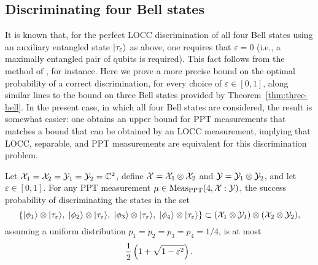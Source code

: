 \subsection{Discriminating four Bell states}

It is known that, for the perfect LOCC discrimination of all four Bell states
using an auxiliary entangled state $\lvert\mspace{0.5mu} \tau_{\varepsilon} \mspace{0.5mu} \rangle$ as above,
one requires that $\varepsilon = 0$ (i.e., a maximally entangled pair of qubits
is required).
This fact follows from the method of \cite{Horodecki03}, for instance.
Here we prove a more precise bound on the optimal probability of a correct
discrimination, for every choice of $\varepsilon\in[0,1]$, along similar lines
to the bound on three Bell states provided by Theorem~\ref{thm:three-bell}.
In the present case, in which all four Bell states are considered, the result
is somewhat easier: one obtains an upper bound for PPT measurements that
matches a bound that can be obtained by an LOCC measurement,
implying that LOCC, separable, and PPT measurements are equivalent for this
discrimination problem.

\begin{theorem}
  \label{thm:four-bell}
  Let $\mathcal{X}_1 = \mathcal{X}_2 = \mathcal{Y}_1 = \mathcal{Y}_2 = \mathbb{C}^2$, define
  $\mathcal{X} = \mathcal{X}_1 \otimes \mathcal{X}_2$ and $\mathcal{Y} = \mathcal{Y}_1 \otimes \mathcal{Y}_2$, and let
  $\varepsilon\in [0,1]$.
  For any PPT measurement $\mu\in\mathrm{Meas}_{\mathrm{PPT}}(4,\mathcal{X}:\mathcal{Y})$, the success
  probability of discriminating the states in the set
  \begin{equation}
    \label{eq:set-four-bells}
    \left\{ \lvert\mspace{0.5mu} \phi_{1} \mspace{0.5mu} \rangle \otimes \lvert\mspace{0.5mu} \tau_{\varepsilon} \mspace{0.5mu} \rangle,\; 
    \lvert\mspace{0.5mu} \phi_{2} \mspace{0.5mu} \rangle \otimes \lvert\mspace{0.5mu} \tau_{\varepsilon} \mspace{0.5mu} \rangle,\;
    \lvert\mspace{0.5mu} \phi_{3} \mspace{0.5mu} \rangle \otimes \lvert\mspace{0.5mu} \tau_{\varepsilon} \mspace{0.5mu} \rangle,\; 
    \lvert\mspace{0.5mu} \phi_{4} \mspace{0.5mu} \rangle \otimes \lvert\mspace{0.5mu} \tau_{\varepsilon} \mspace{0.5mu} \rangle\right\} 
    \subset (\mathcal{X}_1\otimes\mathcal{Y}_1)\otimes(\mathcal{X}_2\otimes\mathcal{Y}_2),
  \end{equation}
  assuming a uniform distribution $p_1 = p_2 = p_3 = p_4 = 1/4$, is at most
  \begin{equation}
    \label{eq:probability-four-bell}
    \frac{1}{2}\left(1 + \sqrt{1 - \varepsilon^2}\right).
  \end{equation}
\end{theorem}

